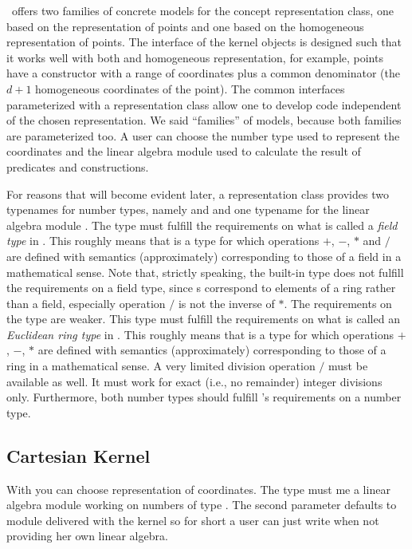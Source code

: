 \cgal\ offers two families of concrete models for the concept
representation class, one based on the 
representation of points and one based on the homogeneous
representation of points.  The interface of the kernel objects is
designed such that it works well with both
 and homogeneous representation, for
example, points have a constructor with a range of coordinates plus a
common denominator (the $d+1$ homogeneous coordinates of the point).
The common interfaces parameterized with a representation class allow
one to develop code independent of the chosen representation.  We said
``families'' of models, because both families are parameterized too.
A user can choose the number type used to represent the coordinates
and the linear algebra module used to calculate the result of
predicates and constructions.

For reasons that will become evident later, a representation class
provides two typenames for number types,
namely  and  and one typename for the linear
algebra module .
The type  must fulfill the
requirements on what is called a {\em field type} in \cgal. This
roughly means that  is a type for which operations $+$,
$-$, $*$ and $/$ are defined with semantics (approximately)
corresponding to those of a field in a mathematical sense. Note that,
strictly speaking, the built-in type  does not fulfill the
requirements on a field type, since s correspond to elements
of a ring rather than a field, especially operation $/$ is not the
inverse of $*$.  The requirements on the type  are
weaker.  This type must fulfill the requirements on what is called an
{\em Euclidean ring type} in \cgal. This roughly means that
 is a type for which operations $+$, $-$, $*$ are
defined with semantics (approximately) corresponding to those of a
ring in a mathematical sense.  A very limited division operation $/$
must be available as well.  It must work for exact (i.e., no
remainder) integer divisions only.  Furthermore, both number types
should fulfill \cgal's requirements on a number type.  

\subsection{Cartesian Kernel}
With  you can choose
 representation of coordinates. The type
 must me a linear algebra module working on numbers
of type . The second parameter defaults to module
delivered with the kernel so for short a user can just write
 when not providing her own linear
algebra.

